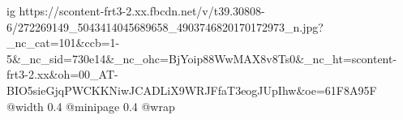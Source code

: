  
 
 
 
 

\ifcmt
  ig https://scontent-frt3-2.xx.fbcdn.net/v/t39.30808-6/272269149_5043414045689658_4903746820170172973_n.jpg?_nc_cat=101&ccb=1-5&_nc_sid=730e14&_nc_ohc=BjYoip88WwMAX8v8Ts0&_nc_ht=scontent-frt3-2.xx&oh=00_AT-BIO5sieGjqPWCKKNiwJCADLiX9WRJFfaT3eogJUpIhw&oe=61F8A95F
  @width 0.4
  @minipage 0.4
  @wrap \parpic[r]
\fi
